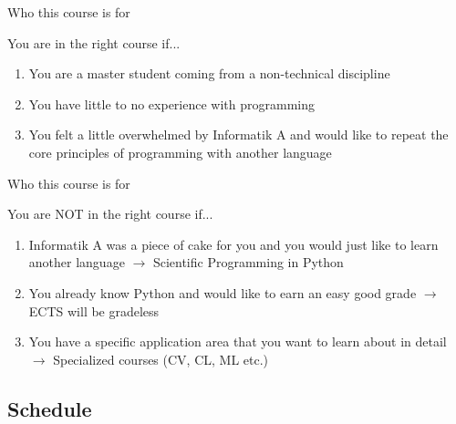 \begin{frame}{Who this course is for}

    You are in the right course if...
    \newline
    \begin{enumerate}[a]
        \item You are a master student coming from a non-technical discipline
        \item You have little to no experience with programming
        \item You felt a little overwhelmed by Informatik A and would like to repeat the core principles of programming with another language
    \end{enumerate}

\end{frame}

\begin{frame}{Who this course is for}

    You are NOT in the right course if...
    \newline
    \begin{enumerate}[a]
        \item Informatik A was a piece of cake for you and you would just like to learn another language
        \newline $\rightarrow$ Scientific Programming in Python
        \item You already know Python and would like to earn an easy good grade
        \newline $\rightarrow$ ECTS will be gradeless
        \item You have a specific application area that you want to learn about in detail
        \newline $\rightarrow$ Specialized courses (CV, CL, ML etc.)
    \end{enumerate}

\end{frame}

\subsection{Schedule}

